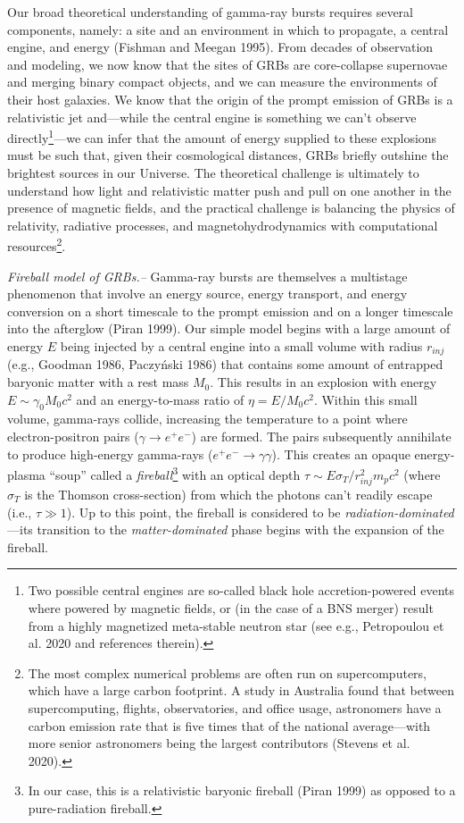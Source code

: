 \documentclass[1.5,11pt]{beavtex}
\begin{document}
Our broad theoretical understanding of gamma-ray bursts requires several components, namely: a site and an environment in which to propagate, a central engine, and energy (Fishman and Meegan 1995). From decades of observation and modeling, we now know that the sites of GRBs are core-collapse supernovae and merging binary compact objects, and we can measure the environments of their host galaxies. We know that the origin of the prompt emission of GRBs is a relativistic jet and---while the central engine is something we can't observe directly\footnote{\selectfont Two possible central engines are so-called black hole accretion-powered events where powered by magnetic fields, or (in the case of a BNS merger) result from a highly magnetized meta-stable neutron star (see e.g., Petropoulou et al. 2020 and references therein).}---we can infer that the amount of energy supplied to these explosions must be such that, given their cosmological distances, GRBs briefly outshine the brightest sources in our Universe. The theoretical challenge is ultimately to understand how light and relativistic matter push and pull on one another in the presence of magnetic fields, and the practical challenge is balancing the physics of relativity, radiative processes, and magnetohydrodynamics with computational resources\footnote{\selectfont The most complex numerical problems are often run on supercomputers, which have a large carbon footprint. A study in Australia found that between supercomputing, flights, observatories, and office usage, astronomers have a carbon emission rate that is five times that of the national average---with more senior astronomers being the largest contributors (Stevens et al. 2020).}.  

\textit{Fireball model of GRBs.–} Gamma-ray bursts are themselves a multistage phenomenon that involve an energy source, energy transport, and energy conversion on a short timescale to the prompt emission and on a longer timescale into the afterglow (Piran 1999). Our simple model begins with a large amount of energy $E$ being injected by a central engine into a small volume with radius $r_{inj}$ (e.g., Goodman 1986, Paczy\'{n}ski 1986) that contains some amount of entrapped baryonic matter with a rest mass $M_0$. This results in an explosion with energy $E \sim \gamma_0 M_0 c^2$ and an energy-to-mass ratio of $\eta = E/M_0c^2$. Within this small volume, gamma-rays collide, increasing the temperature to a point where electron-positron pairs ($\gamma \rightarrow e^+e^-$) are formed. The pairs subsequently annihilate to produce high-energy gamma-rays  ($e^+e^- \rightarrow \gamma\gamma$). This creates an opaque energy-plasma ``soup'' called a \textit{fireball}\footnote{\selectfont In our case, this is a relativistic baryonic fireball (Piran 1999) as opposed to a pure-radiation fireball.} with an optical depth $\tau \sim E \sigma_T / r_{inj}^2m_pc^2$ (where $\sigma_T$ is the Thomson cross-section) from which the photons can't readily escape (i.e., $\tau \gg 1$). Up to this point, the fireball is considered to be \textit{radiation-dominated}---its transition to the \textit{matter-dominated} phase begins with the expansion of the fireball. 
\end{document}
